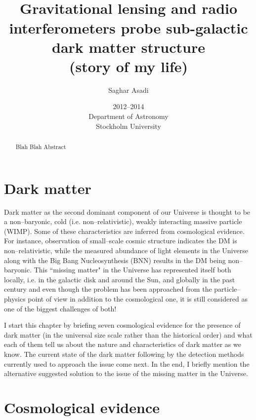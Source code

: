 \documentclass[paper=a4, fontsize=11pt]{scrartcl} %
\title{    
\normalfont \normalsize 
\horrule{0.5pt} \\[0.4cm] %
\huge  Gravitational lensing and radio interferometers probe sub-galactic dark matter structure\\
\large (story of my life) %
\horrule{2pt} \\[0.5cm] %
}
\author{Saghar Asadi} %
\date{\normalsize 2012--2014 \\ Department of Astronomy \\ Stockholm University} %
\numberwithin{equation}{section} %
\numberwithin{figure}{section} %
\numberwithin{table}{section} %
\newcommand{\ignore}[1]{}
\begin{document}
\maketitle %
\newpage
\tableofcontents
\newpage

\begin{abstract}
Blah Blah Abstract
\end{abstract}

\newpage
\section*{Dark matter}
Dark matter as the second dominant component of our Universe is thought to be a non--baryonic, cold (i.e. non--relativistic), weakly interacting massive particle (WIMP). Some of these characteristics are inferred from cosmological evidence. For instance, observation of small--scale cosmic structure indicates the DM is non--relativistic, while the measured abundance of light elements in the Universe along with the Big Bang Nucleosynthesis  (BNN) results in the DM being non--baryonic. This ``missing matter" in the Universe has represented itself both locally, i.e. in the galactic disk and around the Sun, and globally in the past century and even though the problem has been approached from the particle--physics point of view in addition to the cosmological one, it is still considered as one of the biggest challenges of both! 

I start this chapter by briefing seven cosmological evidence for the presence of dark matter (in the universal size scale rather than the historical order) and what each of them tell us about the nature and characteristics of dark matter as we know. The current state of the dark matter following by the detection methods currently used to approach the issue come next. In the end, I briefly mention the alternative suggested solution to the issue of the missing matter in the Universe.
 
\ignore{On the one hand, modern data suggests an insignificant amount of dark matter in the Solar vicinity which is made of baryonic but not luminous matter such as faint stars or Jupiter--like objects. In short, according to our current understanding of the Universe, dark matter is the dominant matter component of the Universe.}
\section{Cosmological evidence}
\end{document}
